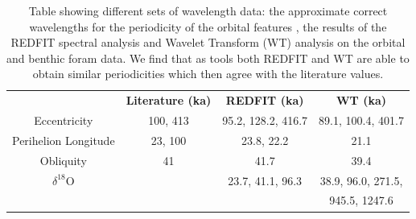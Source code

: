\documentclass[12pt, onecolumn]{revtex4}    %
\begin{document}
\begin{table}[h!]
\centering
\begin{tabular}{c@{\hskip 20pt}c@{\hskip 20pt}c@{\hskip 20pt}c} 
 \hline
  & \textbf{Literature (ka)} &\textbf{REDFIT (ka)} & \textbf{WT (ka)} \\ [0.5ex] 
 Eccentricity & 100, 413 & 95.2, 128.2, 416.7 & 89.1, 100.4,  401.7\\
 Perihelion Longitude & 23, 100 & 23.8, 22.2 & 21.1 \\
 Obliquity & 41 & 41.7 & 39.4 \\
 $\delta^{18}$O & & 23.7, 41.1, 96.3  & 38.9, 96.0, 271.5, \\
 & & & 945.5, 1247.6 \\
 \hline
\end{tabular}
\caption{Table showing different sets of wavelength data: the approximate correct wavelengths for the periodicity of the orbital features \cite{campisano_milankovitch}, the results of the REDFIT spectral analysis and Wavelet Transform (WT) analysis on the orbital and benthic foram data. We find that as tools both REDFIT and WT are able to obtain similar periodicities which then agree with the literature values. }
\vspace{-0.5em}
\label{table:final_results}
\end{table}
\end{document}
